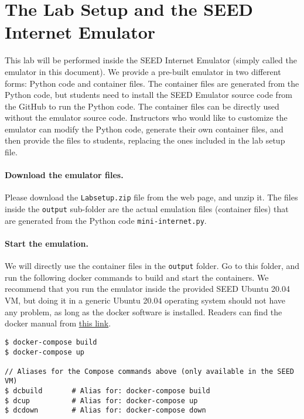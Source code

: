 \section{The Lab Setup and the SEED Internet Emulator} 

This lab will be performed inside the SEED Internet Emulator (simply
called the emulator in this document). 
We provide a pre-built emulator in two different forms: Python code
and container files. The container files are generated from
the Python code, but students need to install the SEED Emulator source 
code from the GitHub to run the Python code. The container files
can be directly used without the emulator source code. 
Instructors who would like to customize the emulator can modify the Python
code, generate their own container files, and then provide the
files to students, replacing the ones included in the 
lab setup file.


\paragraph{Download the emulator files.}
Please download the \texttt{Labsetup.zip} file from the web page, and 
unzip it. The files inside the \texttt{output} sub-folder are the actual
emulation files (container files) that are
generated from the Python code \texttt{mini-internet.py}.


\paragraph{Start the emulation.}
We will directly use the container files in the \texttt{output} folder. 
Go to this folder, and run the following docker commands
to build and start the containers. We recommend that you run the emulator inside
the provided SEED Ubuntu 20.04 VM, but doing it in a generic Ubuntu 20.04 operating system
should not have any problem, as long as the docker software is installed. 
Readers can find the docker manual from 
\href{https://github.com/seed-labs/seed-labs/blob/master/manuals/docker/SEEDManual-Container.md}
{\underline{this link}}.

\begin{lstlisting}
$ docker-compose build
$ docker-compose up

// Aliases for the Compose commands above (only available in the SEED VM)
$ dcbuild       # Alias for: docker-compose build
$ dcup          # Alias for: docker-compose up
$ dcdown        # Alias for: docker-compose down
\end{lstlisting}


